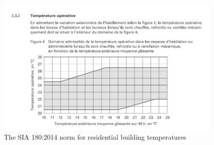 \begin{figure}[ht]
    \centering
    \includegraphics[width = \textwidth]{Images/sia_180_2014.png}
    \caption{The SIA 180:2014 norm for residential building temperatures}
    \label{fig:sia_temperature_norm}
\end{figure}

\clearpage
